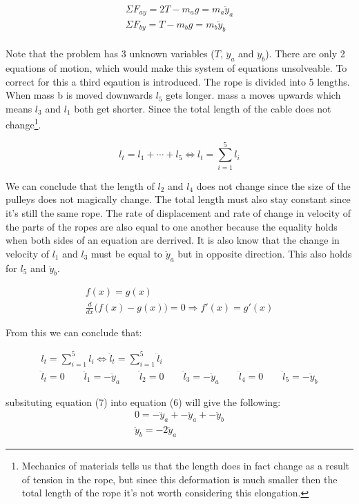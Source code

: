 \documentclass[11pt, a4paper]{article}
\begin{document}
\begin{align}
    \Sigma F_{ay} = 2T - m_a g = m_a \ddot{y}_a \\
    \Sigma F_{by} = T - m_b g = m_b \ddot{y}_b
\end{align}
\\
Note that the problem has 3 unknown variables ($T$, $\ddot{y}_a$ and $\ddot{y}_b$).
There are only 2 equations of motion, which would make this system of equations
unsolveable. To correct for this a third eqaution is introduced.
The rope is divided into 5 lengths. When mass b is moved downwards $l_5$ gets longer.
mass a moves upwards which means $l_3$ and $l_1$ both get shorter.
Since the total length of the cable does not change\footnote{Mechanics of materials tells us that the length does in fact change
as a result of tension in the rope, but since this deformation is much smaller then
the total length of the rope it's not worth considering this elongation.}.

\begin{equation}
    l_t = l_1 + \cdots + l_5 \Leftrightarrow l_t = \sum_{i=1}^{5} l_i
\end{equation}

We can conclude that the length of $l_2$ and $l_4$ does not change since the size
of the pulleys does not magically change. The total length must also stay constant
since it's still the same rope. The rate of displacement and rate of change in velocity
of the parts of the ropes are also equal to one another because the equality holds when both
sides of an equation are derrived. It is also know that the change in velocity of $l_1$ and $l_3$
must be equal to $\ddot{y}_a$ but in opposite direction. This also holds
for $l_5$ and $\ddot{y}_b$.

\begin{gather}
    f(x) = g(x) \\
    \frac{d}{dx} \Big(f(x) - g(x)\Big) = 0 \Rightarrow f'(x) = g'(x)
\end{gather}

From this we can conclude that:

\begin{gather}
    l_t = \sum_{i=1}^{5} l_i \Leftrightarrow \ddot{l}_t = \sum_{i=1}^{5} \ddot{l}_i \\
    \ddot{l}_t = 0 \qquad \ddot{l}_1 = -\ddot{y}_a \qquad \ddot{l}_2 = 0 \qquad \ddot{l}_3 = -\ddot{y}_a \qquad \ddot{l}_4 = 0 \qquad \ddot{l}_5 = -\ddot{y}_b
\end{gather}

subsituting equation (7) into equation (6) will give the following:
\begin{gather}
    0 = -\ddot{y}_a +  -\ddot{y}_a +  -\ddot{y}_b\\
    \ddot{y}_b = -2\ddot{y}_a
\end{gather}
\end{document}
